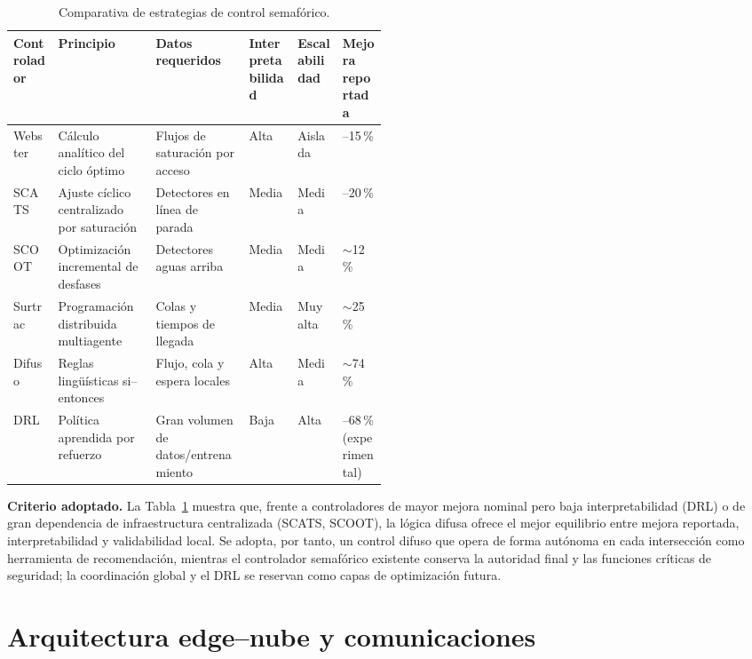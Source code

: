 \begin{table}[H]
  \centering
  \caption{Comparativa de estrategias de control semafórico.}
  \label{tab:control}
  \begin{tabularx}{\linewidth}{@{}>{\raggedright\arraybackslash}p{0.12\linewidth}XX>{\raggedright\arraybackslash}p{0.13\linewidth}>{\raggedright\arraybackslash}p{0.12\linewidth}>{\raggedright\arraybackslash}p{0.12\linewidth}@{}}
    \toprule
    \textbf{Controlador} & \textbf{Principio} & \textbf{Datos requeridos} & \textbf{Interpre\-tabilidad} & \textbf{Escala\-bilidad} & \textbf{Mejora reportada} \\
    \midrule
    Webster & Cálculo analítico del ciclo óptimo & Flujos de saturación por acceso & Alta & Aislada & 10--15\,\% \\
    SCATS & Ajuste cíclico centralizado por saturación & Detectores en línea de parada & Media & Media & 12--20\,\% \\
    SCOOT & Optimización incremental de desfases & Detectores aguas arriba & Media & Media & $\sim$12\,\% \\
    Surtrac & Programación distribuida multiagente & Colas y tiempos de llegada & Media & Muy alta & $\sim$25\,\% \\
    Difuso & Reglas lingüísticas si--entonces & Flujo, cola y espera locales & Alta & Media & $\sim$74\,\% \\
    DRL & Política aprendida por refuerzo & Gran volumen de datos/entrenamiento & Baja & Alta & 27--68\,\% (experimental) \\
    \bottomrule
  \end{tabularx}
\end{table}

\textbf{Criterio adoptado.} La Tabla~\ref{tab:control} muestra que, frente a controladores de mayor mejora
nominal pero baja interpretabilidad (DRL) o de gran dependencia de infraestructura centralizada (SCATS,
SCOOT), la lógica difusa ofrece el mejor equilibrio entre mejora reportada, interpretabilidad y validabilidad
local. Se adopta, por tanto, un control difuso que opera de forma autónoma en cada intersección como
herramienta de recomendación, mientras el controlador semafórico existente conserva la autoridad final y las
funciones críticas de seguridad; la coordinación global y el DRL se reservan como capas de optimización
futura.

\section{Arquitectura edge--nube y comunicaciones}\label{sec:arquitectura}

